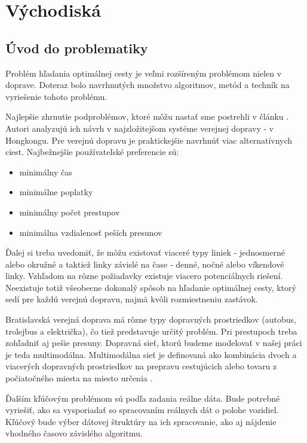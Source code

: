 \chapter{Východiská}
\label{kap:vyc} %

\section{Úvod do problematiky}
\label{sec:intro}
Problém hľadania optimálnej cesty je veľmi rozšíreným problémom nielen v doprave. Doteraz bolo navrhnutých množstvo algoritmov, metód a techník na vyriešenie tohoto problému. 

Najlepšie zhrnutie podproblémov, ktoré môžu nastať sme postrehli v článku \cite{circular}. 
Autori analyzujú ich návrh v najzložitejšom systéme verejnej dopravy - v Hongkongu. Pre verejnú dopravu je praktickejšie navrhnúť viac alternatívnych ciest. Najbežnejšie používateľské preferencie sú:
\begin{itemize}
\setlength\itemsep{-0.3em}
\item{minimálny čas}
\item{minimálne poplatky}
\item{minimálny počet prestupov}
\item{minimálna vzdialenosť peších presunov}
\end{itemize}
Ďalej si treba uvedomiť, že môžu existovať viaceré typy liniek - jednosmerné alebo okružné a taktiež linky závislé na čase - denné, nočné alebo víkendové linky. Vzhľadom na rôzne požiadavky existuje viacero potenciálnych riešení. Neexistuje totiž všeobecne dokonalý spôsob na hľadanie optimálnej cesty, ktorý sedí pre každú verejnú dopravu, najmä kvôli rozmiestneniu zastávok.

Bratislavská verejná doprava má rôzne typy dopravných prostriedkov (autobus, trolejbus a električka), čo tiež predstavuje určitý problém. Pri prestupoch treba zohľadniť aj pešie presuny. Dopravná sieť, ktorú budeme modelovať v našej práci je teda multimodálna. Multimodálna sieť je definovaná ako kombinácia dvoch a viacerých dopravných prostriedkov na prepravu cestujúcich alebo tovaru z počiatočného miesta na miesto určenia \cite{timedependent}.

Ďalším kľúčovým problémom sú podľa zadania reálne dáta. Bude potrebné vyriešiť, ako sa vysporiadať so spracovaním reálnych dát o polohe vozidiel. Kľúčový bude výber dátovej štruktúry na ich spracovanie, ako aj nájdenie vhodného časovo závislého algoritmu.

